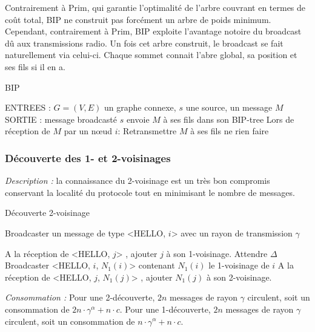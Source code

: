 Contrairement à Prim, qui garantie l'optimalité de l'arbre couvrant en termes de coût total,
BIP ne construit pas forcément un arbre de poids minimum. Cependant, contrairement à Prim, 
BIP exploite l'avantage notoire du broadcast dû aux transmissions radio. Un fois cet arbre 
construit, le broadcast se fait naturellement via celui-ci. Chaque sommet connait l'abre global,
sa position et ses fils si il en a.



\begin{algorithm}[H]
\caption{BIP}
\label{algo_BIP}
\begin{algorithmic}
\STATE ENTREES :  $G=(V,E)$ un graphe connexe, $s$ une source, un message $M$
\STATE SORTIE : message broadcasté
\STATE $s$ envoie $M$ à ses fils dans son BIP-tree
\STATE Lors de réception de $M$ par un nœud $i$:
	\STATE Retransmettre $M$ à ses fils
\ELSE
	\STATE ne rien faire
\ENDIF
\end{algorithmic}
\end{algorithm}

\subsubsection{Découverte des 1- et 2-voisinages}
\emph{Description :} la connaissance du 2-voisinage est un très bon compromis conservant la localité du protocole tout en minimisant le nombre de messages.

\begin{algorithm}[H]
\caption{Découverte 2-voisinage}
\label{algo_k_voisinage}
\begin{algorithmic}

	\STATE Broadcaster un message de type <HELLO, $i$> avec un rayon de transmission $\gamma$
\ENDFOR

\STATE A la réception de <HELLO, $j$> , ajouter $j$ à son 1-voisinage.
\STATE Attendre $\Delta$
	\STATE Broadcaster <HELLO, $i$, $N_1(i)$> contenant $N_1(i)$ le 1-voisinage de $i$
	\STATE A la réception de <HELLO, $j$, $N_1(j)$> , ajouter $N_1(j)$ à son 2-voisinage.
	
\ENDFOR
\end{algorithmic}
\end{algorithm}

\emph{Consommation :} Pour une 2-découverte, $2n$ messages de rayon $\gamma$ circulent, soit un consommation de $2n\cdot \gamma^\alpha +  n\cdot c$.
Pour une 1-découverte, $2n$ messages de rayon $\gamma$ circulent, soit un consommation de $n\cdot \gamma^\alpha +  n\cdot c$.



